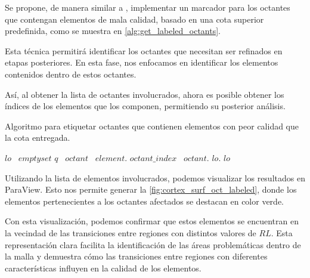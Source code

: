Se propone, de manera similar a \cite{daines2018repairing}, implementar un marcador para los octantes que contengan elementos de mala calidad, basado en una cota superior predefinida, como se muestra en \autoref{alg:get_labeled_octants}.


Esta técnica permitirá identificar los octantes que necesitan ser refinados en etapas posteriores. En esta fase, nos enfocamos en identificar los elementos contenidos dentro de estos octantes.

Así, al obtener la lista de octantes involucrados, ahora es posible obtener los índices de los elementos que los componen, permitiendo su posterior análisis.


\begin{algorithm}
\caption{Algoritmo para etiquetar octantes que contienen elementos con peor calidad que la cota entregada.}\label{alg:get_labeled_octants} 
{
    $lo$ \gets \, $empty set$ \;
     {
        $q$ \gets \, \;
         {
            $octant$ \gets \, $element$.\getOctant{}\;
            $octant\_index$ \gets \, $octant$.\getIndex{}\;
            $lo$.\;
        }
    }
    \KwRet $lo$\;    
}
\end{algorithm}

Utilizando la lista de elementos involucrados, podemos visualizar los resultados en ParaView. Esto nos permite generar la \autoref{fig:cortex_surf_oct_labeled}, donde los elementos pertenecientes a los octantes afectados se destacan en color verde. 

Con esta visualización, podemos confirmar que estos elementos se encuentran en la vecindad de las transiciones entre regiones con distintos valores de $RL$. Esta representación clara facilita la identificación de las áreas problemáticas dentro de la malla y demuestra cómo las transiciones entre regiones con diferentes características influyen en la calidad de los elementos.

